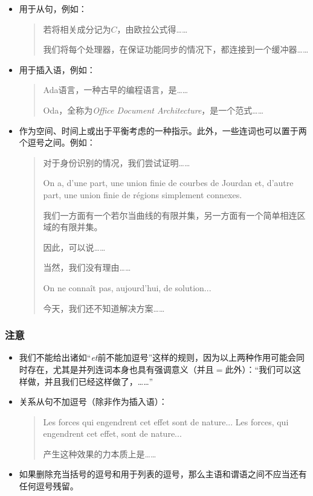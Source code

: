 \begin{itemize}
    \item 用于从句，例如：
    \begin{quote}
        若将相关成分记为$C$，由欧拉公式得……

        我们将每个处理器，在保证功能同步的情况下，都连接到一个缓冲器……
    \end{quote}
    \item 用于插入语，例如：
    \begin{quote}
        Ada语言，一种古早的编程语言，是……

        Oda，全称为\emph{Office Document Architecture}，是一个范式……
    \end{quote}
    \item 作为空间、时间上或出于平衡考虑的一种指示。此外，一些连词也可以置于两个逗号之间。例如：
    \begin{quote}
        对于身份识别的情况，我们尝试证明……

        On a, d’une part, une union finie de courbes de Jourdan et, d’autre part, une union finie de régions simplement connexes.
        \begin{bil}
            我们一方面有一个若尔当曲线的有限并集，另一方面有一个简单相连区域的有限并集。
        \end{bil}

        因此，可以说……

        当然，我们没有理由……

        On ne connaît pas, aujourd’hui, de solution...
        \begin{bil}
            今天，我们还不知道解决方案……
        \end{bil}
    \end{quote}
\end{itemize}

\subsubsection{注意}

\begin{itemize}
    \item 我们不能给出诸如“\emph{et}前不能加逗号”这样的规则，因为以上两种作用可能会同时存在，尤其是并列连词本身也具有强调意义（并且$=$此外）：“我们可以这样做，并且我们已经这样做了，……”
    \item 关系从句不加逗号（除非作为插入语）：
    \begin{quote}
        Les forces qui engendrent cet effet sont de nature...
        Les forces, qui engendrent cet effet, sont de nature...
        \begin{bil}
            产生这种效果的力本质上是……
        \end{bil}
    \end{quote}
    \item 如果删除充当括号的逗号和用于列表的逗号，那么主语和谓语之间不应当还有任何逗号残留。
\end{itemize}

